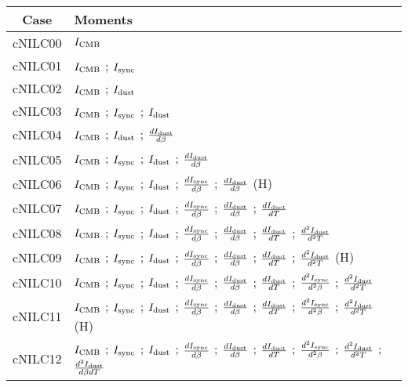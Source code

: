 \begin{tabular}{cl}
\toprule
    Case &                                                                                                                                                                                                                                                                                                         Moments \\
\midrule
 cNILC00 &  $I_{\rm CMB}$ \\
 cNILC01 &  $I_{\rm CMB}$ ; $I_{\rm sync}$ \\
 cNILC02 &  $I_{\rm CMB}$ ; $I_{\rm dust}$ \\
 cNILC03 &  $I_{\rm CMB}$ ; $I_{\rm sync}$ ; $I_{\rm dust}$ \\
 cNILC04 &  $I_{\rm CMB}$ ; $I_{\rm dust}$ ; $\frac{d I_{\rm dust}}{d \beta}$ \\
 cNILC05 &  $I_{\rm CMB}$ ; $I_{\rm sync}$ ; $I_{\rm dust}$ ; $\frac{d I_{\rm dust}}{d \beta}$ \\
 cNILC06 &  $I_{\rm CMB}$ ; $I_{\rm sync}$ ; $I_{\rm dust}$ ; $\frac{d I_{\rm sync}}{d \beta}$ ; $\frac{d I_{\rm dust}}{d \beta}$ (H) \\
 cNILC07 &  $I_{\rm CMB}$ ; $I_{\rm sync}$ ; $I_{\rm dust}$ ; $\frac{d I_{\rm sync}}{d \beta}$ ; $\frac{d I_{\rm dust}}{d \beta}$ ; $\frac{d I_{\rm dust}}{d T}$ \\
 cNILC08 &  $I_{\rm CMB}$ ; $I_{\rm sync}$ ; $I_{\rm dust}$ ; $\frac{d I_{\rm sync}}{d \beta}$ ; $\frac{d I_{\rm dust}}{d \beta}$ ; $\frac{d I_{\rm dust}}{d T}$ ; $\frac{d^2 I_{\rm dust}}{d^2 T}$ \\
 cNILC09 &  $I_{\rm CMB}$ ; $I_{\rm sync}$ ; $I_{\rm dust}$ ; $\frac{d I_{\rm sync}}{d \beta}$ ; $\frac{d I_{\rm dust}}{d \beta}$ ; $\frac{d I_{\rm dust}}{d T}$ ; $\frac{d^2 I_{\rm dust}}{d^2 T}$ (H) \\
 cNILC10 &  $I_{\rm CMB}$ ; $I_{\rm sync}$ ; $I_{\rm dust}$ ; $\frac{d I_{\rm sync}}{d \beta}$ ; $\frac{d I_{\rm dust}}{d \beta}$ ; $\frac{d I_{\rm dust}}{d T}$ ; $\frac{d^2 I_{\rm sync}}{d^2 \beta}$ ; $\frac{d^2 I_{\rm dust}}{d^2 T}$ \\
 cNILC11 &  $I_{\rm CMB}$ ; $I_{\rm sync}$ ; $I_{\rm dust}$ ; $\frac{d I_{\rm sync}}{d \beta}$ ; $\frac{d I_{\rm dust}}{d \beta}$ ; $\frac{d I_{\rm dust}}{d T}$ ; $\frac{d^2 I_{\rm sync}}{d^2 \beta}$ ; $\frac{d^2 I_{\rm dust}}{d^2 T}$ (H) \\
 cNILC12 &  $I_{\rm CMB}$ ; $I_{\rm sync}$ ; $I_{\rm dust}$ ; $\frac{d I_{\rm sync}}{d \beta}$ ; $\frac{d I_{\rm dust}}{d \beta}$ ; $\frac{d I_{\rm dust}}{d T}$ ; $\frac{d^2 I_{\rm sync}}{d^2 \beta}$ ; $\frac{d^2 I_{\rm dust}}{d^2 T}$ ; $\frac{d^2 I_{\rm dust}}{d \beta d T}$ \\

\end{tabular}
